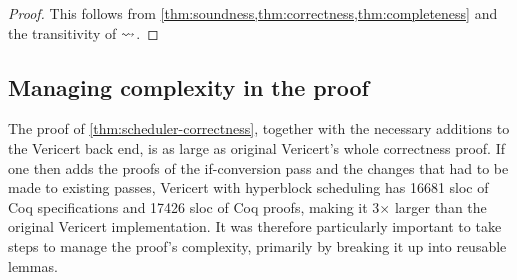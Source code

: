 {\begin{theorem}
  \begin{proof}
    This follows from \cref{thm:soundness,thm:correctness,thm:completeness} and
    the transitivity of $\mathrel{\leadsto}$.
  \end{proof}

%

\end{theorem}

\subsection{Managing complexity in the proof}

The proof of \cref{thm:scheduler-correctness}, together with the necessary
additions to the Vericert back end, is as large as original Vericert's whole
correctness proof. If one then adds the proofs of the if-conversion pass and the
changes that had to be made to existing passes, Vericert with hyperblock
scheduling has 16681 sloc of Coq specifications and 17426 sloc of Coq proofs,
making it 3$\times$ larger than the original Vericert implementation. It was
therefore particularly important to take steps to manage the proof's complexity,
primarily by breaking it up into reusable lemmas.

}

